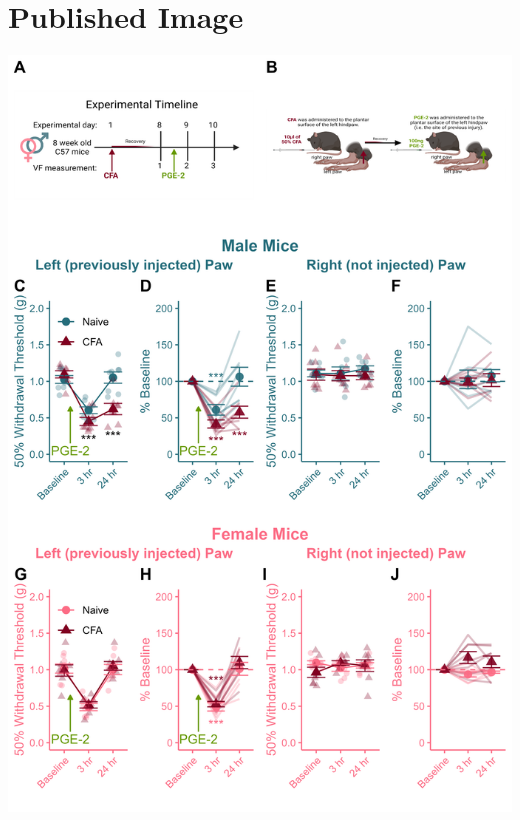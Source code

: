 \documentclass[
]{book}
\begin{document}
\hypertarget{published-image-3}{%
\section*{Published Image}\label{published-image-3}}

\begin{center}\includegraphics[width=58.33in]{Figs/4_CFA_PGE2} \end{center}
\end{document}
